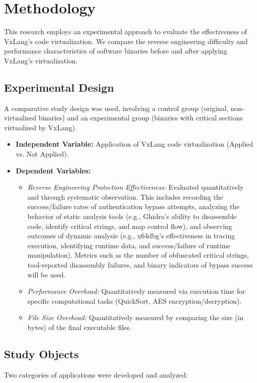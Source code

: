 \section{Methodology} \label{sec:methodology}
This research employs an experimental approach to evaluate the effectiveness of VxLang's code virtualization. We compare the reverse engineering difficulty and performance characteristics of software binaries before and after applying VxLang's virtualization.

\subsection{Experimental Design}
A comparative study design was used, involving a control group (original, non-virtualized binaries) and an experimental group (binaries with critical sections virtualized by VxLang).

\begin{itemize}
    \item \textbf{Independent Variable:} Application of VxLang code virtualization (Applied vs. Not Applied).
    \item \textbf{Dependent Variables:}
        \begin{itemize}
            \item \textit{Reverse Engineering Protection Effectiveness:} Evaluated quantitatively and through systematic observation. This includes recording the success/failure rates of authentication bypass attempts, analyzing the behavior of static analysis tools (e.g., Ghidra's ability to disassemble code, identify critical strings, and map control flow), and observing outcomes of dynamic analysis (e.g., x64dbg's effectiveness in tracing execution, identifying runtime data, and success/failure of runtime manipulation). Metrics such as the number of obfuscated critical strings, tool-reported disassembly failures, and binary indicators of bypass success will be used.
            \item \textit{Performance Overhead:} Quantitatively measured via execution time for specific computational tasks (QuickSort, AES encryption/decryption).
            \item \textit{File Size Overhead:} Quantitatively measured by comparing the size (in bytes) of the final executable files.
        \end{itemize}
\end{itemize}

\subsection{Study Objects}
Two categories of applications were developed and analyzed:


